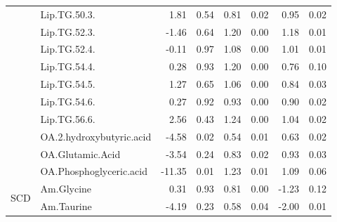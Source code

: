 \documentclass{amsart}
\begin{document}
\begin{table}
\begin{tabular}{clrrrrrr}
 & Lip.TG.50.3. & {\cellcolor[rgb]{0.604,0.776,0.49}}1.81 & 0.54 & {\cellcolor[rgb]{0.824,0.902,0.773}}0.81 & 0.02 & {\cellcolor[rgb]{0.796,0.882,0.737}}0.95 & 0.02 \\
 & Lip.TG.52.3. & {\cellcolor[rgb]{0.965,0.898,0.898}}-1.46 & 0.64 & {\cellcolor[rgb]{0.741,0.851,0.663}}1.20 & 0.00 & {\cellcolor[rgb]{0.741,0.855,0.671}}1.18 & 0.01 \\
 & Lip.TG.52.4. & {\cellcolor[rgb]{0.996,0.992,0.992}}-0.11 & 0.97 & {\cellcolor[rgb]{0.765,0.867,0.698}}1.08 & 0.00 & {\cellcolor[rgb]{0.78,0.875,0.718}}1.01 & 0.01 \\
 & Lip.TG.54.4. & {\cellcolor[rgb]{0.941,0.965,0.922}}0.28 & 0.93 & {\cellcolor[rgb]{0.741,0.851,0.667}}1.20 & 0.00 & {\cellcolor[rgb]{0.835,0.906,0.788}}0.76 & 0.10 \\
 & Lip.TG.54.5. & {\cellcolor[rgb]{0.722,0.843,0.643}}1.27 & 0.65 & {\cellcolor[rgb]{0.769,0.871,0.702}}1.06 & 0.00 & {\cellcolor[rgb]{0.82,0.898,0.765}}0.84 & 0.03 \\
 & Lip.TG.54.6. & {\cellcolor[rgb]{0.945,0.969,0.925}}0.27 & 0.92 & {\cellcolor[rgb]{0.796,0.886,0.737}}0.93 & 0.00 & {\cellcolor[rgb]{0.804,0.89,0.749}}0.90 & 0.02 \\
 & Lip.TG.56.6. & {\cellcolor[rgb]{0.439,0.678,0.278}}2.56 & 0.43 & {\cellcolor[rgb]{0.729,0.847,0.655}}1.24 & 0.00 & {\cellcolor[rgb]{0.773,0.871,0.706}}1.04 & 0.02 \\
 & OA.2.hydroxybutyric.acid & {\cellcolor[rgb]{0.898,0.678,0.686}}-4.58 & 0.02 & {\cellcolor[rgb]{0.882,0.933,0.847}}0.54 & 0.01 & {\cellcolor[rgb]{0.863,0.922,0.824}}0.63 & 0.02 \\
 & OA.Glutamic.Acid & {\cellcolor[rgb]{0.922,0.753,0.757}}-3.54 & 0.24 & {\cellcolor[rgb]{0.82,0.898,0.769}}0.83 & 0.02 & {\cellcolor[rgb]{0.8,0.886,0.741}}0.93 & 0.03 \\
 & OA.Phosphoglyceric.acid & {\cellcolor[rgb]{0.749,0.212,0.231}}-11.35 & 0.01 & {\cellcolor[rgb]{0.733,0.847,0.655}}1.23 & 0.01 & {\cellcolor[rgb]{0.761,0.863,0.694}}1.09 & 0.06 \\ \midrule
\multirow{17}{0.056\linewidth}{\hspace{0pt}\Centering{}SCD} & Am.Glycine & {\cellcolor[rgb]{0.933,0.961,0.914}}0.31 & 0.93 & {\cellcolor[rgb]{0.824,0.902,0.773}}0.81 & 0.00 & {\cellcolor[rgb]{0.973,0.914,0.914}}-1.23 & 0.12 \\
 & Am.Taurine & {\cellcolor[rgb]{0.906,0.706,0.714}}-4.19 & 0.23 & {\cellcolor[rgb]{0.875,0.929,0.839}}0.58 & 0.04 & {\cellcolor[rgb]{0.953,0.859,0.863}}-2.00 & 0.01 \\

\end{tabular}
\end{table}
\end{document}
